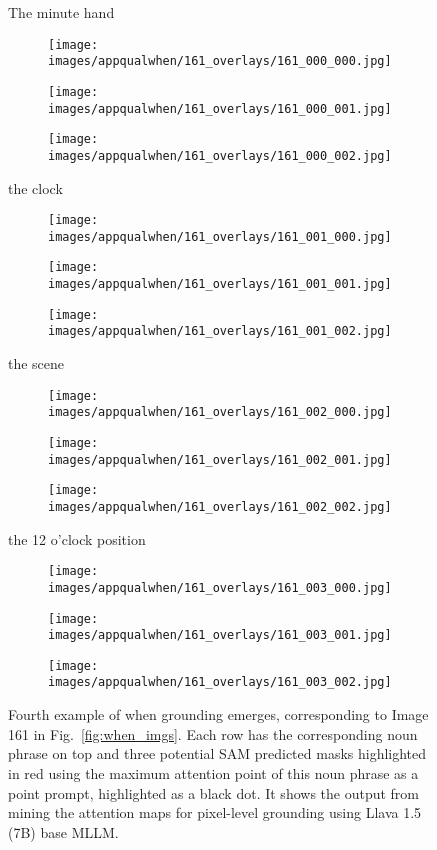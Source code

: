 \begin{figure}[t]
\centering
The minute hand
\begin{subfigure}{0.16\textwidth}
\texttt{[image: images/appqualwhen/161\_overlays/161\_000\_000.jpg]}
\end{subfigure}%
\begin{subfigure}{0.16\textwidth}
\texttt{[image: images/appqualwhen/161\_overlays/161\_000\_001.jpg]}
\end{subfigure}%
\begin{subfigure}{0.16\textwidth}
\texttt{[image: images/appqualwhen/161\_overlays/161\_000\_002.jpg]}
\end{subfigure}

the clock
\begin{subfigure}{0.16\textwidth}
\texttt{[image: images/appqualwhen/161\_overlays/161\_001\_000.jpg]}
\end{subfigure}%
\begin{subfigure}{0.16\textwidth}
\texttt{[image: images/appqualwhen/161\_overlays/161\_001\_001.jpg]}
\end{subfigure}%
\begin{subfigure}{0.16\textwidth}
\texttt{[image: images/appqualwhen/161\_overlays/161\_001\_002.jpg]}
\end{subfigure}

the scene
\begin{subfigure}{0.16\textwidth}
\texttt{[image: images/appqualwhen/161\_overlays/161\_002\_000.jpg]}
\end{subfigure}%
\begin{subfigure}{0.16\textwidth}
\texttt{[image: images/appqualwhen/161\_overlays/161\_002\_001.jpg]}
\end{subfigure}%
\begin{subfigure}{0.16\textwidth}
\texttt{[image: images/appqualwhen/161\_overlays/161\_002\_002.jpg]}
\end{subfigure}

the 12 o'clock position
\begin{subfigure}{0.16\textwidth}
\texttt{[image: images/appqualwhen/161\_overlays/161\_003\_000.jpg]}
\end{subfigure}%
\begin{subfigure}{0.16\textwidth}
\texttt{[image: images/appqualwhen/161\_overlays/161\_003\_001.jpg]}
\end{subfigure}%
\begin{subfigure}{0.16\textwidth}
\texttt{[image: images/appqualwhen/161\_overlays/161\_003\_002.jpg]}
\end{subfigure}
\caption{Fourth example of when grounding emerges, corresponding to Image 161 in Fig.~\ref{fig:when_imgs}. Each row has the corresponding noun phrase on top and three potential SAM predicted masks highlighted in red using the maximum attention point of this noun phrase as a point prompt, highlighted as a black dot. It shows the output from mining the attention maps for pixel-level grounding using Llava 1.5 (7B) base MLLM.}
\label{fig:when4}
\end{figure}


